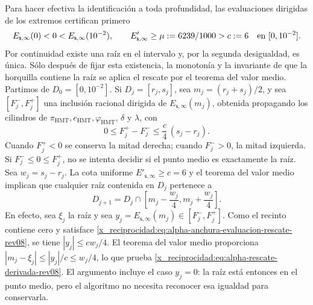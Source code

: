 Para hacer efectiva la identificación a toda profundidad, las evaluaciones
dirigidas de los extremos certifican primero
\[
 E_{\mathsf s,\infty}(0)<0<
 E_{\mathsf s,\infty}(10^{-2}),
 \qquad
 E'_{\mathsf s,\infty}\geq\mu:=6239/1000>c:=6
 \quad\hbox{en }[0,10^{-2}].
\]
Por continuidad existe una raíz en el intervalo y, por la segunda desigualdad,
es única. Sólo después de fijar esta existencia, la monotonía y la invariante
de que la horquilla contiene la raíz se aplica el rescate por el teorema del
valor medio. Partimos de \(D_0=[0,10^{-2}]\). Si
\(D_j=[r_j,s_j]\), sea \(m_j=(r_j+s_j)/2\), y sea
\([F_j^-,F_j^+]\) una inclusión racional dirigida de
\(E_{\mathsf s,\infty}(m_j)\), obtenida propagando los cilindros de
\(\pi_{\mathrm{HMT}},e_{\mathrm{HMT}},\varphi_{\mathrm{HMT}}\),
\(\delta\) y \(\lambda\), con
\begin{equation}
 0\leq F_j^+-F_j^-\leq \frac{c}{4}\,(s_j-r_j).
 \label{x_reciprocidad:eq:alpha-anchura-evaluacion-rescate-rev08}
\end{equation}
Cuando \(F_j^+<0\) se conserva la mitad derecha;
cuando \(F_j^->0\), la mitad izquierda. Si
\(F_j^-\leq0\leq F_j^+\), no se intenta decidir si el punto medio es
exactamente la raíz. Sea \(w_j=s_j-r_j\). La cota uniforme
\(E'_{\mathsf s,\infty}\geq c=6\) y el teorema del valor medio implican que
cualquier raíz contenida en \(D_j\) pertenece a
\begin{equation}
 D_{j+1}=D_j\cap
 \left[m_j-\frac{w_j}{4},
             m_j+\frac{w_j}{4}\right].
 \label{x_reciprocidad:eq:alpha-rescate-derivada-rev08}
\end{equation}
En efecto, sea \(\xi_j\) la raíz y sea
\(y_j=E_{\mathsf s,\infty}(m_j)\in[F_j^-,F_j^+]\). Como el recinto contiene
cero y satisface \eqref{x_reciprocidad:eq:alpha-anchura-evaluacion-rescate-rev08}, se tiene
\(|y_j|\leq cw_j/4\). El teorema del valor medio proporciona
\(|m_j-\xi_j|\leq |y_j|/c\leq w_j/4\), lo que prueba
\eqref{x_reciprocidad:eq:alpha-rescate-derivada-rev08}. El argumento incluye el caso
\(y_j=0\): la raíz está entonces en el punto medio, pero el algoritmo no
necesita reconocer esa igualdad para conservarla.

